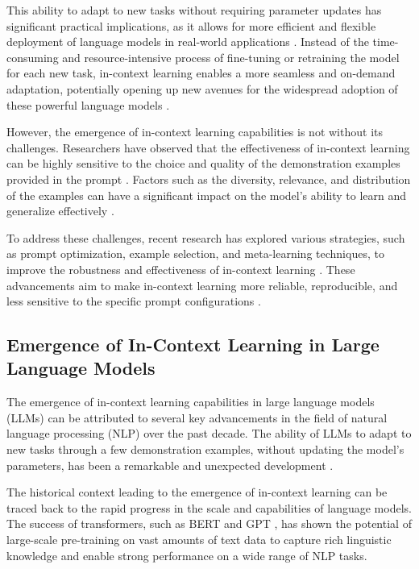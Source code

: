 \documentclass[11pt]{article}
\begin{document}
This ability to adapt to new tasks without requiring parameter updates has significant practical implications, as it allows for more efficient and flexible deployment of language models in real-world applications \cite{ref9}. Instead of the time-consuming and resource-intensive process of fine-tuning or retraining the model for each new task, in-context learning enables a more seamless and on-demand adaptation, potentially opening up new avenues for the widespread adoption of these powerful language models \cite{ref10}.

However, the emergence of in-context learning capabilities is not without its challenges. Researchers have observed that the effectiveness of in-context learning can be highly sensitive to the choice and quality of the demonstration examples provided in the prompt \cite{ref11}. Factors such as the diversity, relevance, and distribution of the examples can have a significant impact on the model's ability to learn and generalize effectively \cite{ref12}.

To address these challenges, recent research has explored various strategies, such as prompt optimization, example selection, and meta-learning techniques, to improve the robustness and effectiveness of in-context learning \cite{ref13}. These advancements aim to make in-context learning more reliable, reproducible, and less sensitive to the specific prompt configurations \cite{ref14}.

\subsection{Emergence of In-Context Learning in Large Language Models}

The emergence of in-context learning capabilities in large language models (LLMs) can be attributed to several key advancements in the field of natural language processing (NLP) over the past decade. The ability of LLMs to adapt to new tasks through a few demonstration examples, without updating the model's parameters, has been a remarkable and unexpected development \cite{ref15}.

The historical context leading to the emergence of in-context learning can be traced back to the rapid progress in the scale and capabilities of language models. The success of transformers, such as BERT \cite{ref16} and GPT \cite{ref17}, has shown the potential of large-scale pre-training on vast amounts of text data to capture rich linguistic knowledge and enable strong performance on a wide range of NLP tasks.
\end{document}
